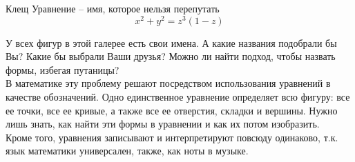 \begin{surferPage}{Клещ}
Уравнение – имя, которое нельзя перепутать\\
\smallskip
\[x^2 + y^2	= z^3	(1 - z) \]


\singlespacing
У всех фигур в этой галерее есть свои имена. А какие названия подобрали бы Вы? Какие бы выбрали Ваши друзья? Можно ли найти подход, чтобы назвать формы, избегая путаницы?\\
\vspace{0.3cm}
В математике эту проблему решают посредством использования уравнений в качестве обозначений. Одно единственное уравнение определяет всю фигуру: все ее точки, все ее кривые, а также все ее отверстия, складки и вершины. Нужно лишь знать, как найти эти формы в уравнении и как их потом изобразить.\\
\vspace{0.3cm}
Кроме того, уравнения записывают и интерпретируют повсюду одинаково, т.к. язык математики универсален, также, как ноты в музыке.
\end{surferPage}
